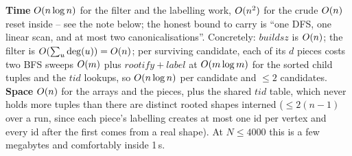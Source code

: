 \begin{complexitybox}
\textbf{Time} \(O(n\log n)\) for the filter and the labelling work, \(O(n^2)\) for
the crude \(O(n)\) reset inside  -- see the note below; the honest bound to
carry is ``one DFS, one linear scan, and at most two canonicalisations''. Concretely:
\(\mathit{buildsz}\) is \(O(n)\); the filter is \(O(\sum_u\deg(u))=O(n)\); per
surviving candidate, each of its \(d\) pieces costs two BFS sweeps \(O(m)\) plus
\(\mathit{rootify}+\mathit{label}\) at \(O(m\log m)\) for the sorted child tuples and the
\(\mathit{tid}\) lookups, so \(O(n\log n)\) per candidate and \(\le 2\) candidates.
\textbf{Space} \(O(n)\) for the arrays and the pieces, plus the shared \(\mathit{tid}\)
table, which never holds more tuples than there are distinct rooted shapes interned
(\(\le 2(n-1)\) over a run, since each piece's labelling creates at most one id per vertex
and every id after the first comes from a real shape). At \(N\le4000\) this is a few
megabytes and comfortably inside 1\,s.
\end{complexitybox}

